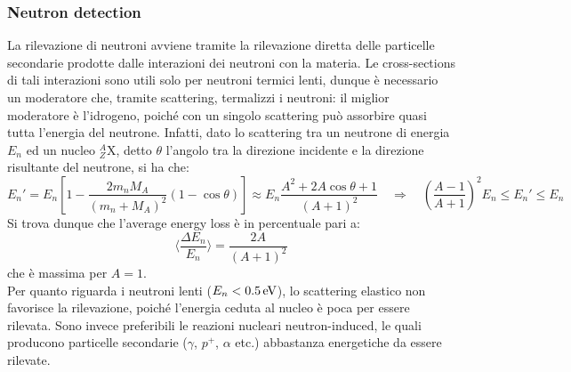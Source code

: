 \subsubsection{Neutron detection}

La rilevazione di neutroni avviene tramite la rilevazione diretta delle particelle secondarie prodotte dalle interazioni dei neutroni con la materia. Le cross-sections di tali interazioni sono utili solo per neutroni termici lenti, dunque è necessario un moderatore che, tramite scattering, termalizzi i neutroni: il miglior moderatore è l'idrogeno, poiché con un singolo scattering può assorbire quasi tutta l'energia del neutrone. Infatti, dato lo scattering tra un neutrone di energia $ E_n $ ed un nucleo $ ^A_Z\text{X} $, detto $ \theta $ l'angolo tra la direzione incidente e la direzione risultante del neutrone, si ha che:
\begin{equation*}
	E_n' = E_n \left[ 1 - \frac{2 m_n M_A}{(m_n + M_A)^2} (1 - \cos \theta) \right] \approx E_n \frac{A^2 + 2A \cos \theta + 1}{(A + 1)^2} \quad\Rightarrow\quad \left( \frac{A - 1}{A + 1} \right)^2 E_n \le E_n' \le E_n
\end{equation*}
Si trova dunque che l'average energy loss è in percentuale pari a:
\begin{equation}
	\bigg\langle \frac{\Delta E_n}{E_n} \bigg\rangle = \frac{2A}{(A + 1)^2}
	\label{eq:3.13}
\end{equation}
che è massima per $ A = 1 $.\\
Per quanto riguarda i neutroni lenti ($ E_n < 0.5 \,\mathrm{eV} $), lo scattering elastico non favorisce la rilevazione, poiché l'energia ceduta al nucleo è poca per essere rilevata. Sono invece preferibili le reazioni nucleari neutron-induced, le quali producono particelle secondarie ($ \gamma $, $ p^+ $, $ \alpha $ etc.) abbastanza energetiche da essere rilevate.

